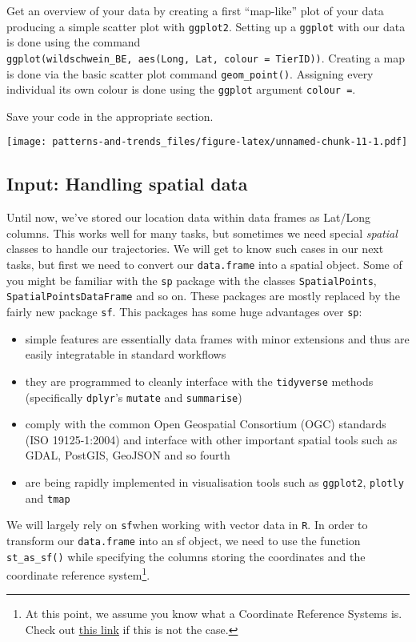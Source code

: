 \documentclass[]{book}
\providecommand{\tightlist}{%
  \setlength{\itemsep}{0pt}\setlength{\parskip}{0pt}}
\let\rmarkdownfootnote\footnote%
\def\footnote{\protect\rmarkdownfootnote}
\begin{document}
Get an overview of your data by creating a first ``map-like'' plot of your data producing a simple scatter plot with \texttt{ggplot2}.
Setting up a \texttt{ggplot} with our data is done using the command \texttt{ggplot(wildschwein\_BE,\ aes(Long,\ Lat,\ colour\ =\ TierID))}. Creating a map is done via the basic scatter plot command \texttt{geom\_point()}.
Assigning every individual its own colour is done using the \texttt{ggplot} argument \texttt{colour\ =}.

Save your code in the appropriate section.

\texttt{[image: patterns-and-trends\_files/figure-latex/unnamed-chunk-11-1.pdf]}

\hypertarget{input-handling-spatial-data}{%
\subsection{Input: Handling spatial data}\label{input-handling-spatial-data}}

Until now, we've stored our location data within data frames as Lat/Long columns. This works well for many tasks, but sometimes we need special \emph{spatial} classes to handle our trajectories. We will get to know such cases in our next tasks, but first we need to convert our \texttt{data.frame} into a spatial object.
Some of you might be familiar with the \texttt{sp} package with the classes \texttt{SpatialPoints}, \texttt{SpatialPointsDataFrame} and so on. These packages are mostly replaced by the fairly new package \texttt{sf}. This packages has some huge advantages over \texttt{sp}:

\begin{itemize}
\tightlist
\item
  simple features are essentially data frames with minor extensions and thus are easily integratable in standard workflows
\item
  they are programmed to cleanly interface with the \texttt{tidyverse} methods (specifically \texttt{dplyr}'s \texttt{mutate} and \texttt{summarise})
\item
  comply with the common Open Geospatial Consortium (OGC) standards (ISO 19125-1:2004) and interface with other important spatial tools such as GDAL, PostGIS, GeoJSON and so fourth
\item
  are being rapidly implemented in visualisation tools such as \texttt{ggplot2}, \texttt{plotly} and \texttt{tmap}
\end{itemize}

We will largely rely on \texttt{sf}when working with vector data in \texttt{R}. In order to transform our \texttt{data.frame} into an sf object, we need to use the function \texttt{st\_as\_sf()} while specifying the columns storing the coordinates and the coordinate reference system\footnote{At this point, we assume you know what a Coordinate Reference Systems is. Check out \href{https://earthdatascience.org/courses/earth-analytics/spatial-data-r/intro-to-coordinate-reference-systems/}{this link} if this is not the case.}.
\end{document}

